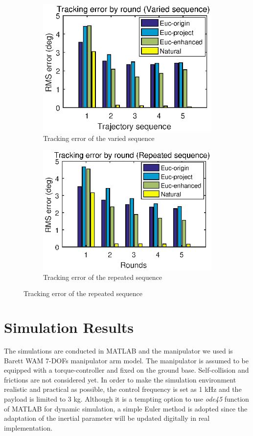 \documentclass[letterpaper, 10 pt, conference]{ieeeconf}  %
\begin{document}
\begin{multicols}{1}
\begin{figure}[!htb]
\centering
\begin{subfigure}
\centering
\includegraphics[width=.5\textwidth]{fig/ByRoundVaried.eps}
\caption{Tracking error of the varied sequence}
\label{fig:varied}
\end{subfigure}
\begin{subfigure}
\centering
\includegraphics[width=.5\textwidth]{fig/ByRoundRepeated.eps}
\caption{Tracking error of the repeated sequence}
\label{fig:repeated}
\end{subfigure}
\end{figure}
\end{multicols}

\section{Simulation Results}
The simulations are conducted in MATLAB and the manipulator we used is Barett WAM 7-DOFs manipulator arm model. The manipulator is assumed to be equipped with a torque-controller and fixed on the ground base. Self-collision and frictions are not considered yet. In order to make the simulation environment realistic and practical as possible, the control frequency is set as 1 kHz and the payload is limited to 3 kg. Although it is a tempting option to use {\it{ode45}} function of MATLAB for dynamic simulation, a simple Euler method is adopted since the adaptation of the inertial parameter will be updated digitally in real implementation.
\end{document}
